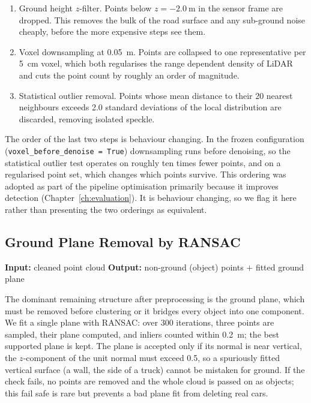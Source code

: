 \documentclass[a4paper,12pt]{report}
\begin{document}
\begin{enumerate}
  \item Ground height $z$-filter. Points below
    $z = \SI{-2.0}{\meter}$ in the sensor frame are dropped. This removes the bulk
    of the road surface and any sub-ground noise cheaply, before the more
    expensive steps see them.
  \item Voxel downsampling at \SI{0.05}{\meter}. Points are collapsed to
    one representative per \SI{5}{\centi\meter} voxel, which both regularises the
    range dependent density of LiDAR and cuts the point count by roughly an order
    of magnitude.
  \item Statistical outlier removal. Points whose mean distance to their
    \num{20} nearest neighbours exceeds \num{2.0} standard deviations of the
    local distribution are discarded, removing isolated speckle.
\end{enumerate}

The order of the last two steps is behaviour changing. In the frozen configuration
(\texttt{voxel\_\allowbreak before\_\allowbreak denoise = True}) downsampling runs before
denoising, so the statistical outlier test operates on roughly ten times fewer
points, and on a regularised point set, which changes which points survive.
This ordering was adopted as part of the pipeline optimisation primarily
because it improves detection (Chapter~\ref{ch:evaluation}). It is behaviour changing, so
we flag it here rather than presenting the two orderings as equivalent.

\subsection{Ground Plane Removal by RANSAC}
\label{sec:pipeline-ground}

\noindent \textbf{Input:} cleaned point cloud \quad \textbar \quad \textbf{Output:} non-ground (object) points $+$ fitted ground plane \vspace{0.5em}

The dominant remaining structure after preprocessing is the ground plane, which
must be removed before clustering or it bridges every object into one component.
We fit a single plane with RANSAC: over \num{300} iterations, three points are
sampled, their plane computed, and inliers counted within
\SI{0.2}{\meter}; the best supported plane is kept. The plane is
accepted only if its normal is near vertical, the $z$-component of the
unit normal must exceed \num{0.5}, so a spuriously fitted vertical surface (a
wall, the side of a truck) cannot be mistaken for ground. If the check fails, no
points are removed and the whole cloud is passed on as objects; this fail safe is
rare but prevents a bad plane fit from deleting real cars.
\end{document}

